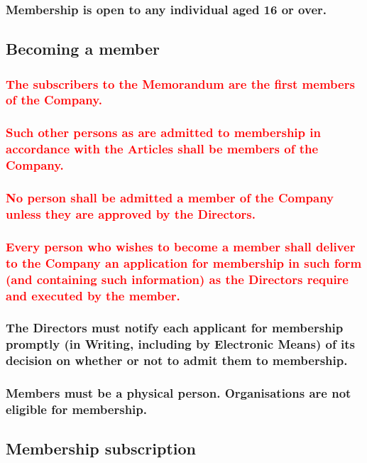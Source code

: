 \documentclass[12pt]{article}
\begin{document}
\subsubsection{Membership is open to any individual aged 16 or over.}

\subsection{Becoming a member}
\subsubsection{\textcolor{red}{The subscribers to the Memorandum are the first members of the Company.}}
\subsubsection{\textcolor{red}{Such other persons as are admitted to membership in accordance with the Articles shall be members of the Company.}}
\subsubsection{\textcolor{red}{No person shall be admitted a member of the Company unless they are approved by the Directors.}}
\subsubsection{\textcolor{red}{Every person who wishes to become a member shall deliver to the Company an application for membership in such form (and containing such information) as the Directors require and executed by the member.}} %
\subsubsection{The Directors must notify each applicant for membership promptly (in Writing, including by Electronic Means) of its decision on whether or not to admit them to membership.} %
\subsubsection{Members must be a physical person. Organisations are not eligible for membership.} %

\subsection{Membership subscription}
\end{document}
